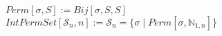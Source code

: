 \documentclass{book}
\newcommand{\abr}{:=}
\newcommand{\cont}{\phantom{.}. . .\phantom{.}}
\newcommand{\pipe}{$\phantom{(}\vrectangleblack\phantom{)}$}
\newcommand{\st}{\mathbin{|}}
\begin{document}
\begin{comment}
  $TranspositionDecomp \abr (\sigma \in \mathcal{S}_n) \implies (\exists_{T}((Transpositions[T]) \land (\sigma = \circ_{\tau_i \in T}(\tau_i))))$
  \begin{enumerate}
    \lit $(n(\sigma) = 0) \implies \ldots$
    \begin{enumerate}
      \lit $\sigma = I_n$
      \lit $(Transpositions[\langle (1 2), (1 2) \rangle]) \land (\sigma = I_n = (1 2) \circ (1 2))$
      \lit $\exists_{T}((Transpositions[T]) \land (\sigma = \circ_{\tau_i \in T}(\tau_i)))$
    \end{enumerate}
    \lit $(n(\sigma) = 0) \implies (\exists_{T}((Transpositions[T]) \land (\sigma = \circ_{\tau_i \in T}(\tau_i))))$
    \lit $((n(\sigma) = k + 1) \land (\forall_{\sigma' \in \mathcal{S}_n}((n(\sigma') \leq k) \implies (\exists_{T}((Transpositions[T]) \land (\sigma' = \circ_{\tau_i \in T}(\tau_i))))))) \implies \ldots$
    \begin{enumerate}
      \lit $n(\sigma) = k + 1$ \pipe $n(\sigma) > 1$ \pipe $\exists_{l \in \mathbb{N}}((\sigma(l) \neq l) \land (\forall_{i \in \mathbb{N}_{1, l}}(\sigma(i) = i)))$
      \lit $Transposition[\delta, l, \tau(l)]$ \pipe $n(\delta \circ \sigma) < n(\sigma)$
      \lit $\forall_{\sigma' \in \mathcal{S}_n}((n(\sigma') \leq k) \implies (\exists_{T}((Transpositions[T]) \land (\sigma' = \circ_{\tau_i \in T}(\tau_i)))))$ \pipe $\exists_{T'}((Transpositions[T']) \land (\delta \circ \sigma = \circ_{\tau_i \in T'}(\tau_i)))$
      \lit $\sigma = \delta^{-1} \circ \circ_{\tau_i \in T'}(\tau_i) = \delta \circ \circ_{\tau_i \in T'}(\tau_i) = \circ_{\tau_i \in T''}(\tau_i)$
      \lit $\exists_{T''}((Transpositions[T'']) \land (\sigma = \circ_{\tau_i \in T''}(\tau_i)))$
    \end{enumerate}
    \lit $((n(\sigma) = k + 1) \land (\forall_{\sigma' \in \mathcal{S}_n}((n(\sigma') \leq k) \implies (\exists_{T}((Transpositions[T]) \land (\sigma' = \circ_{\tau_i \in T}(\tau_i))))))) \implies$ \cont
    \lit \cont $(\exists_{T''}((Transpositions[T'']) \land (\sigma = \circ_{\tau_i \in T''}(\tau_i))))$
    \lit $Induction$ \pipe $\exists_{T}((Transpositions[T]) \land (\sigma = \circ_{\tau_i \in T}(\tau_i)))$
  \end{enumerate} \vspace{.75mm} \hrule \vspace{.75mm} \ \\ 
\end{comment}

$Perm[\sigma, S] \abr Bij[\sigma, S, S]$ \\
$IntPermSet[\mathcal{S}_n, n] \abr \mathcal{S}_n = \{\sigma \st Perm[\sigma, \mathbb{N}_{1, n}]\}$ \\
\end{document}
